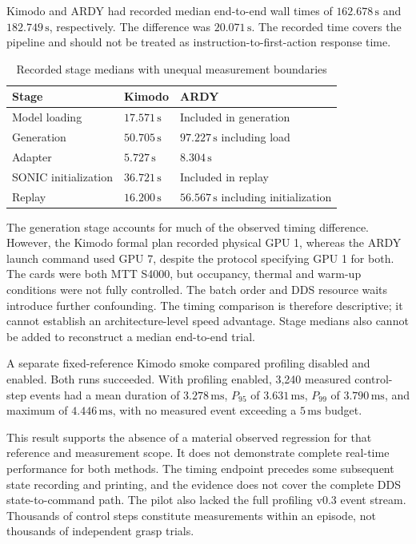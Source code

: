 \documentclass[11pt,a4paper]{article}
\begin{document}
Kimodo and ARDY had recorded median end-to-end wall times of \(162.678\,\mathrm{s}\) and \(182.749\,\mathrm{s}\), respectively. The difference was \(20.071\,\mathrm{s}\). The recorded time covers the pipeline and should not be treated as instruction-to-first-action response time.

\begin{table}[H]
\centering
\caption{Recorded stage medians with unequal measurement boundaries}
\label{tab:comparison-6}
\small
\begin{tabularx}{\linewidth}{|L{\tabcolsep\relax}|C{\tabcolsep\relax}|Y|}
\hline
{}
\textbf{Stage} & \textbf{Kimodo} & \textbf{ARDY} \\ \hline
Model loading & \(17.571\,\mathrm{s}\) & Included in generation \\ \hline
Generation & \(50.705\,\mathrm{s}\) & \(97.227\,\mathrm{s}\) including load \\ \hline
Adapter & \(5.727\,\mathrm{s}\) & \(8.304\,\mathrm{s}\) \\ \hline
SONIC initialization & \(36.721\,\mathrm{s}\) & Included in replay \\ \hline
Replay & \(16.200\,\mathrm{s}\) & \(56.567\,\mathrm{s}\) including initialization \\ \hline
\end{tabularx}
\end{table}

The generation stage accounts for much of the observed timing difference. However, the Kimodo formal plan recorded physical GPU 1, whereas the ARDY launch command used GPU 7, despite the protocol specifying GPU 1 for both. The cards were both MTT S4000, but occupancy, thermal and warm-up conditions were not fully controlled. The batch order and DDS resource waits introduce further confounding. The timing comparison is therefore descriptive; it cannot establish an architecture-level speed advantage. Stage medians also cannot be added to reconstruct a median end-to-end trial.

A separate fixed-reference Kimodo smoke compared profiling disabled and enabled. Both runs succeeded. With profiling enabled, 3,240 measured control-step events had a mean duration of \(3.278\,\mathrm{ms}\), \(P_{95}\) of \(3.631\,\mathrm{ms}\), \(P_{99}\) of \(3.790\,\mathrm{ms}\), and maximum of \(4.446\,\mathrm{ms}\), with no measured event exceeding a \(5\,\mathrm{ms}\) budget.

This result supports the absence of a material observed regression for that reference and measurement scope. It does not demonstrate complete real-time performance for both methods. The timing endpoint precedes some subsequent state recording and printing, and the evidence does not cover the complete DDS state-to-command path. The pilot also lacked the full profiling v0.3 event stream. Thousands of control steps constitute measurements within an episode, not thousands of independent grasp trials.
\end{document}

